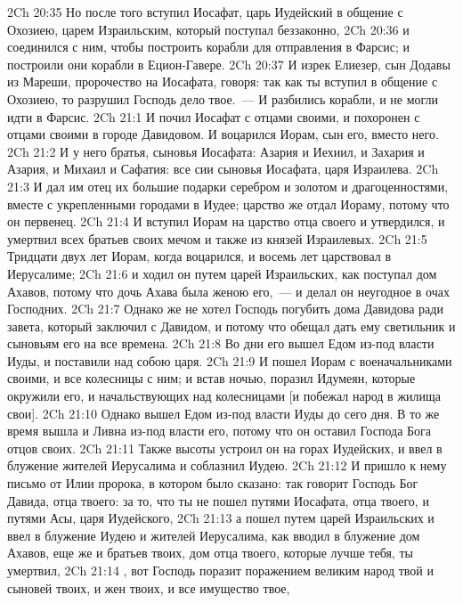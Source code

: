\rsbpar\vs 2Ch 20:35 Но после того вступил Иосафат, царь Иудейский в общение с Охозиею, царем Израильским, который поступал беззаконно,
\vs 2Ch 20:36 и соединился с ним, чтобы построить корабли для отправления в Фарсис; и построили они корабли в Ецион-Гавере.
\vs 2Ch 20:37 И изрек  Елиезер, сын Додавы из Мареши, пророчество на Иосафата, говоря: так как ты вступил в общение с Охозиею, то разрушил Господь дело твое.~--- И разбились корабли, и не могли идти в Фарсис.
\vs 2Ch 21:1 И почил Иосафат с отцами своими, и похоронен с отцами своими в городе Давидовом. И воцарился Иорам, сын его, вместо него.
\vs 2Ch 21:2 И у него  братья, сыновья Иосафата: Азария и Иехиил, и Захария и Азария, и Михаил и Сафатия: все сии сыновья Иосафата, царя Израилева.
\vs 2Ch 21:3 И дал им отец их большие подарки серебром и золотом и драгоценностями, вместе с укрепленными городами в Иудее; царство же отдал Иораму, потому что он первенец.
\vs 2Ch 21:4 И вступил Иорам на царство отца своего и утвердился, и умертвил всех братьев своих мечом и также  из князей Израилевых.
\rsbpar\vs 2Ch 21:5 Тридцати двух лет  Иорам, когда воцарился, и восемь лет царствовал в Иерусалиме;
\vs 2Ch 21:6 и ходил он путем царей Израильских, как поступал дом Ахавов, потому что дочь Ахава была женою его,~--- и делал он неугодное в очах Господних.
\vs 2Ch 21:7 Однако же не хотел Господь погубить дома Давидова ради завета, который заключил с Давидом, и потому что обещал дать ему светильник и сыновьям его на все времена.
\rsbpar\vs 2Ch 21:8 Во дни его вышел Едом из-под власти Иуды, и поставили над собою царя.
\vs 2Ch 21:9 И пошел Иорам с военачальниками своими, и все колесницы с ним; и встав ночью, поразил Идумеян, которые окружили его, и начальствующих над колесницами [и побежал народ в жилища свои].
\vs 2Ch 21:10 Однако вышел Едом из-под власти Иуды до сего дня. В то же время вышла и Ливна из-под власти его, потому что он оставил Господа Бога отцов своих.
\vs 2Ch 21:11 Также высоты устроил он на горах Иудейских, и ввел в блужение жителей Иерусалима и соблазнил Иудею.
\rsbpar\vs 2Ch 21:12 И пришло к нему письмо от Илии пророка, в котором было сказано: так говорит Господь Бог Давида, отца твоего: за то, что ты не пошел путями Иосафата, отца твоего, и путями Асы, царя Иудейского,
\vs 2Ch 21:13 а пошел путем царей Израильских и ввел в блужение Иудею и жителей Иерусалима, как вводил в блужение дом Ахавов, еще же и братьев твоих, дом отца твоего, которые лучше тебя, ты умертвил,
\vs 2Ch 21:14 , вот Господь поразит поражением великим народ твой и сыновей твоих, и жен твоих, и все имущество твое,
